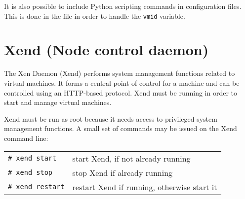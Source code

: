 \documentclass[11pt,twoside,final,openright]{xenstyle}
\begin{document}
It is also possible to include Python scripting commands in
configuration files.  This is done in the  file in
order to handle the {\tt vmid} variable.


\chapter{Xend (Node control daemon)}
\label{cha:xend}

The Xen Daemon (Xend) performs system management functions related to
virtual machines.  It forms a central point of control for a machine
and can be controlled using an HTTP-based protocol.  Xend must be
running in order to start and manage virtual machines.

Xend must be run as root because it needs access to privileged system
management functions.  A small set of commands may be issued on the
Xend command line:

\begin{tabular}{ll}
\verb_# xend start_ & start Xend, if not already running \\
\verb_# xend stop_  & stop Xend if already running       \\
\verb_# xend restart_ & restart Xend if running, otherwise start it \\
\end{tabular}
\end{document}
